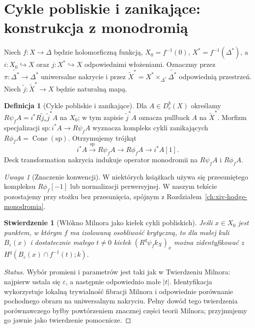 \documentclass[11pt,a4paper,oneside]{report}
\theoremstyle{plain}
\newtheorem{stwierdzenie}[twierdzenie]{Stwierdzenie}
\theoremstyle{definition}
\newtheorem{definicja}[twierdzenie]{Definicja}
\theoremstyle{remark}
\newtheorem{uwaga}[twierdzenie]{Uwaga}
\begin{document}
\section{Cykle pobliskie i zanikające: konstrukcja z monodromią}
\label{sec:xvi-nearby}
Niech $f:X\to\Delta$ będzie holomorficzną funkcją,
$X_0=f^{-1}(0)$, $X^*=f^{-1}(\Delta^*)$, a
$i:X_0\hookrightarrow X$ oraz $j:X^*\hookrightarrow X$
odpowiednimi włożeniami. Oznaczmy przez
$\pi:\widetilde{\Delta^*}\to\Delta^*$ uniwersalne nakrycie
i przez $\widetilde X^*=X^*\times_{\Delta^*}
\widetilde{\Delta^*}$ odpowiednią przestrzeń. Niech
$\widetilde j:\widetilde X^*\to X$ będzie naturalną mapą.

\begin{definicja}[Cykle pobliskie i zanikające]
Dla $A\in D^b_c(X)$ określamy
$R\psi_fA=i^*R\widetilde j_*\widetilde j^*A$
na $X_0$; w tym zapisie $\widetilde j^*A$ oznacza
pullback $A$ na $\widetilde X^*$.
Morfizm specjalizacji $\mathrm{sp}:i^*A\to R\psi_fA$
wyznacza kompleks cykli zanikających
$R\phi_fA=\operatorname{Cone}(\mathrm{sp})$.
Otrzymujemy trójkąt
\[
 i^*A\xrightarrow{\mathrm{sp}}R\psi_fA
 \longrightarrow R\phi_fA\longrightarrow i^*A[1].
\]
Deck transformation nakrycia indukuje operator monodromii
na $R\psi_fA$ i $R\phi_fA$.
\end{definicja}
\begin{uwaga}[Znaczenie konwencji]
W niektórych książkach używa się przesuniętego
kompleksu $R\phi_f[-1]$ lub normalizacji perwersyjnej.
W naszym tekście pozostajemy przy stożku bez przesunięcia,
spójnym z Rozdziałem~\ref{ch:xiv-hodge-monodromia}.
\end{uwaga}
\begin{stwierdzenie}[Włókno Milnora jako kiełek cykli pobliskich]
\label{prop:xvi-milnor-stalk}
Jeśli $x\in X_0$ jest punktem, w którym $f$
ma izolowaną osobliwość krytyczną, to dla małej kuli
$B_\varepsilon(x)$ i dostatecznie małego $t\ne0$
kiełek $(R^q\psi_fk_X)_x$ można zidentyfikować
z $H^q(B_\varepsilon(x)\cap f^{-1}(t);k)$.
\end{stwierdzenie}
\begin{proof}[Status]
Wybór promieni i parametrów jest taki jak w
Twierdzeniu Milnora: najpierw ustala się
$\varepsilon$, a następnie odpowiednio małe $|t|$.
Identyfikacja wykorzystuje lokalną trywialność
fibracji Milnora i odpowiednie porównanie
pochodnego obrazu na uniwersalnym nakryciu.
Pełny dowód tego twierdzenia porównawczego byłby
powtórzeniem znacznej części teorii Milnora;
przyjmujemy go jawnie jako twierdzenie pomocnicze.
\end{proof}
\end{document}
